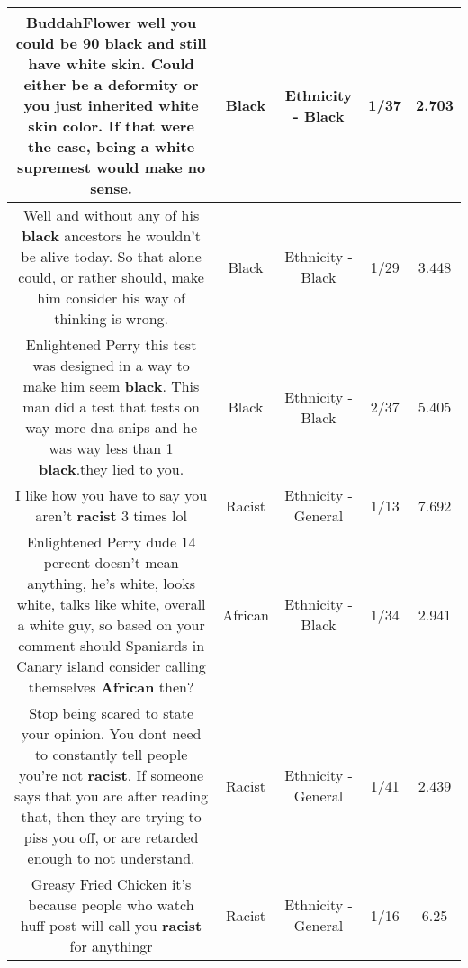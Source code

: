 \documentclass[11pt]{article}
\newlength\mylength
\begin{document}
\begin{center}
\begin{longtable}{|C{.65\mylength}|C{.30\mylength}|C{.12\mylength}|C{.12\mylength}|C{.12\mylength}|}
  \small BuddahFlower well you could be 90 \textbf{black} and still have white skin. Could either be a deformity or you just inherited white skin color. If that were the case, being a white supremest would make no sense.\normalsize   & Black & Ethnicity - Black & 1/37 & 2.703 \\  \hline
  \small Well and without any of his \textbf{black} ancestors he wouldn't be alive today. So that alone could, or rather should, make him consider his way of thinking is wrong.\normalsize   & Black & Ethnicity - Black & 1/29 & 3.448 \\  \hline
  \small Enlightened Perry this test was designed in a way to make him seem \textbf{black}. This man did a test that tests on way more dna snips and he was way less than 1 \textbf{black}.they lied to you.\normalsize   & Black & Ethnicity - Black & 2/37 & 5.405 \\  \hline
  \small I like how you have to say you aren't \textbf{racist} 3 times lol\normalsize   & Racist & Ethnicity - General & 1/13 & 7.692 \\  \hline
  \small Enlightened Perry dude 14 percent doesn't mean anything, he's white, looks white, talks like white, overall a white guy, so based on your comment should Spaniards in Canary island consider calling themselves \textbf{African} then?\normalsize   & African & Ethnicity - Black & 1/34 & 2.941 \\  \hline
  \small Stop being scared to state your opinion. You dont need to constantly tell people you're not \textbf{racist}. If someone says that you are after reading that, then they are trying to piss you off, or are retarded enough to not understand.\normalsize   & Racist & Ethnicity - General & 1/41 & 2.439 \\  \hline
  \small Greasy Fried Chicken it's because people who watch huff post will call you \textbf{racist} for anythingr\normalsize   & Racist & Ethnicity - General & 1/16 & 6.25 \\  \hline

\end{longtable}
\end{center}
\end{document}
